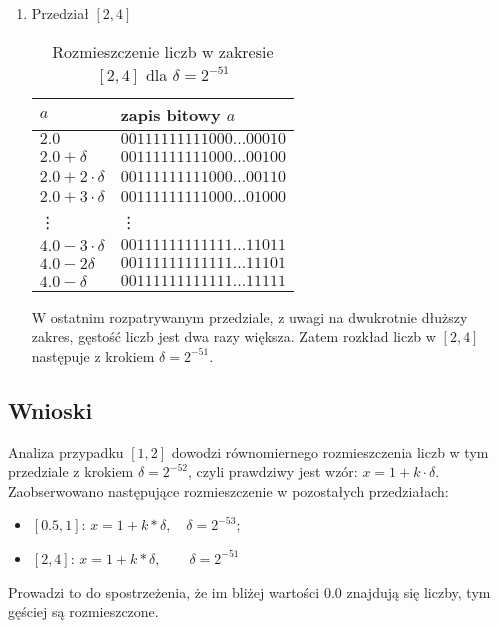 \documentclass{classrep}
\begin{document}
\begin{enumerate}
		\item Przedział $[2,4]$
   			\begin{table}[!h]
        		\centering
            	\begin{tabular}{ll} \toprule
                	$a$ & {zapis bitowy $a$} \\ \midrule
                	$2.0$ & $00111111111000\dots00010$ \\ 
 					$2.0+\delta$ & $00111111111000\dots00100$ \\
 					$2.0+2\cdot\delta$ & $00111111111000\dots00110$ \\
 					$2.0+3\cdot\delta$ & $00111111111000\dots01000$  \\
 					\vdots & \vdots \\
 					$4.0-3\cdot\delta$ & $00111111111111\dots11011$ \\
 					$4.0-2\delta$ & $00111111111111\dots11101$ \\
 					$4.0-\delta$ & $00111111111111\dots11111$ \\\bottomrule
            	\end{tabular}
            	\caption{Rozmieszczenie liczb w zakresie $[2,4]$ dla $\delta = 2^{-51}$}
			\label{table:7}
   			\end{table}
   			W ostatnim rozpatrywanym przedziale, z uwagi na dwukrotnie dłuższy zakres, gęstość liczb jest dwa razy większa.
   			Zatem rozkład liczb w $[2,4]$ następuje z krokiem $\delta = 2^{-51}$.
   			
		\end{enumerate}
	\subsection{Wnioski}
		Analiza przypadku $[1,2]$ dowodzi równomiernego rozmieszczenia liczb w tym przedziale z krokiem $\delta = 
		2^{-52}$, czyli prawdziwy jest wzór: $x=1+k\cdot\delta$. Zaobserwowano następujące rozmieszczenie w pozostałych 
		przedziałach:
		\begin{itemize}
			\item $[0.5,1]$: $x=1+k*\delta, \quad \delta = 2^{-53}$;
			\item $[2,4]$: $x=1+k*\delta, \qquad \delta = 2^{-51}$
		\end{itemize}
		Prowadzi to do spostrzeżenia, że im bliżej wartości $0.0$ znajdują się liczby, tym gęściej są rozmieszczone.
\end{document}

